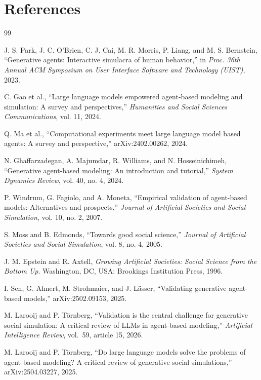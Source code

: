 \documentclass[11pt]{article}
\begin{document}
\section*{References}
\begin{thebibliography}{99}

J. S. Park, J. C. O'Brien, C. J. Cai, M. R. Morris, P. Liang, and M. S. Bernstein, ``Generative agents: Interactive simulacra of human behavior,'' in \emph{Proc. 36th Annual ACM Symposium on User Interface Software and Technology (UIST)}, 2023.

C. Gao et al., ``Large language models empowered agent-based modeling and simulation: A survey and perspectives,'' \emph{Humanities and Social Sciences Communications}, vol. 11, 2024.

Q. Ma et al., ``Computational experiments meet large language model based agents: A survey and perspective,'' arXiv:2402.00262, 2024.

N. Ghaffarzadegan, A. Majumdar, R. Williams, and N. Hosseinichimeh, ``Generative agent-based modeling: An introduction and tutorial,'' \emph{System Dynamics Review}, vol. 40, no. 4, 2024.

P. Windrum, G. Fagiolo, and A. Moneta, ``Empirical validation of agent-based models: Alternatives and prospects,'' \emph{Journal of Artificial Societies and Social Simulation}, vol. 10, no. 2, 2007.

S. Moss and B. Edmonds, ``Towards good social science,'' \emph{Journal of Artificial Societies and Social Simulation}, vol. 8, no. 4, 2005.

J. M. Epstein and R. Axtell, \emph{Growing Artificial Societies: Social Science from the Bottom Up}. Washington, DC, USA: Brookings Institution Press, 1996.

I. Sen, G. Ahnert, M. Strohmaier, and J. L\"{a}sser, ``Validating generative agent-based models,'' arXiv:2502.09153, 2025.

M. Larooij and P. T\"{o}rnberg, ``Validation is the central challenge for generative social simulation: A critical review of LLMs in agent-based modeling,'' \emph{Artificial Intelligence Review}, vol.\ 59, article 15, 2026.

M. Larooij and P. T\"{o}rnberg, ``Do large language models solve the problems of agent-based modeling? A critical review of generative social simulations,'' arXiv:2504.03227, 2025.


\end{thebibliography}
\end{document}
